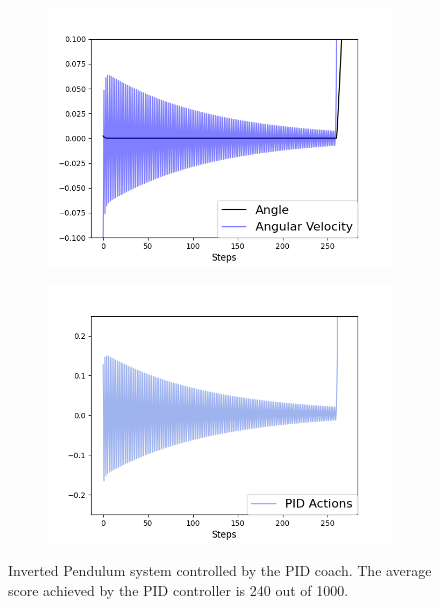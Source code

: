 \begin{figure}
\centering
\begin{subfigure}{0.4\textwidth}
\centering
\includegraphics[width=\linewidth]{ip_PID.png}
\label{fig:ip_pid}
\end{subfigure}%
\begin{subfigure}{.4\textwidth}
\centering
\includegraphics[width=\linewidth]{ip_PID_actions.png}
\label{fig:ip_pid_actions}
\end{subfigure}
\caption{Inverted Pendulum system controlled by the PID coach. The average score achieved by the PID controller is 240 out of 1000.}
\label{fig:ip}
\end{figure}


